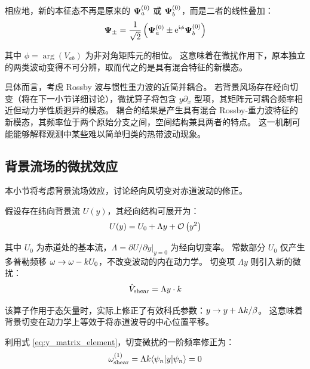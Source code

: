 相应地，新的本征态不再是原来的 $\bm{\Psi}_a^{(0)}$ 或 $\bm{\Psi}_b^{(0)}$，而是二者的线性叠加：
\begin{equation}
    \bm{\Psi}_\pm = \frac{1}{\sqrt{2}} \left( \bm{\Psi}_a^{(0)} \pm \mathrm{e}^{\mathrm{i}\phi} \bm{\Psi}_b^{(0)} \right)
    \label{eq:mixed_states}
\end{equation}

其中 $\phi = \arg(V_{ab})$ 为非对角矩阵元的相位。
这意味着在微扰作用下，原本独立的两类波动变得不可分辨，取而代之的是具有混合特征的新模态。

具体而言，考虑 Rossby 波与惯性重力波的近简并耦合。
若背景风场存在经向切变（将在下一小节详细讨论），微扰算子将包含 $y\partial_x$ 型项，其矩阵元可耦合频率相近但动力学性质迥异的模态。
耦合的结果是产生具有混合 Rossby-重力波特征的新模态，其频率位于两个原始分支之间，空间结构兼具两者的特点。
这一机制可能能够解释观测中某些难以简单归类的热带波动现象。

\subsection{背景流场的微扰效应}
\label{subsec:shear_perturbation}

本小节将考虑背景流场效应，讨论经向风切变对赤道波动的修正。

假设存在纬向背景流 $U(y)$，其经向结构可展开为：
\begin{equation}
    U(y) = U_0 + \Lambda y + \mathcal{O}\left(y^2\right)
    \label{eq:background_flow}
\end{equation}

其中 $U_0$ 为赤道处的基本流，$\Lambda = \partial U/\partial y|_{y=0}$ 为经向切变率。
常数部分 $U_0$ 仅产生多普勒频移 $\omega \to \omega - k U_0$，不改变波动的内在动力学。
切变项 $\Lambda y$ 则引入新的微扰：
\begin{equation}
    \hat{V}_{\mathrm{shear}} = \Lambda y \cdot k
    \label{eq:shear_perturbation}
\end{equation}

该算子作用于态矢量时，实际上修正了有效科氏参数：$y \to y + \Lambda k/\beta$。
这意味着背景切变在动力学上等效于将赤道波导的中心位置平移。

利用式 \eqref{eq:y_matrix_element}，切变微扰的一阶频率修正为：
\begin{equation}
    \omega^{(1)}_{\mathrm{shear}} = \Lambda k \langle \psi_{n} | y | \psi_{n} \rangle = 0
    \label{eq:shear_first_order}
\end{equation}

